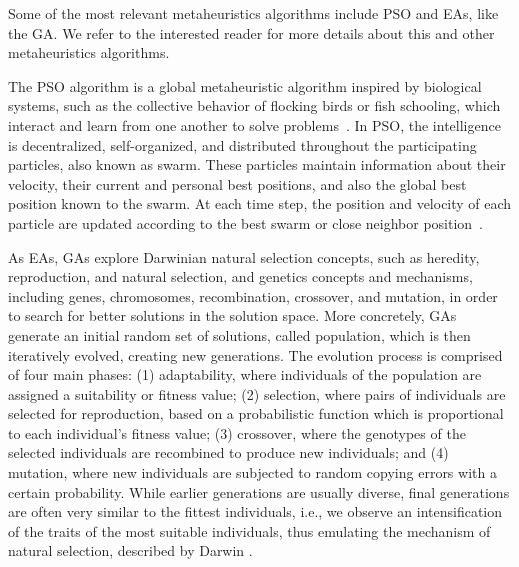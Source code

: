 	Some of the most relevant metaheuristics algorithms include \ac{PSO} and \acp{EA}, like the \ac{GA}. We refer  to the interested reader for more details about this and other metaheuristics algorithms.
	
	The \ac{PSO} algorithm is a global metaheuristic algorithm inspired by biological systems, such as the collective behavior of flocking birds or fish schooling, which interact and learn from one another to solve problems~\cite{Brownlee2011}. In \ac{PSO}, the intelligence is decentralized, self-organized, and distributed throughout the participating particles, also known as swarm. These particles maintain information about their velocity, their current and personal best positions, and also the global best position known to the swarm. At each time step, the position and velocity of each particle are updated according to the best swarm or close neighbor position~\cite{Brownlee2011}.
	
	As \acp{EA}, \acp{GA} explore Darwinian natural selection concepts, such as heredity, reproduction, and natural selection, and genetics concepts and mechanisms, including genes, chromosomes, recombination, crossover, and mutation, in order to search for better solutions in the solution space. More concretely, \acp{GA} generate an initial random set of solutions, called population, which is then iteratively evolved, creating new generations. The evolution process is comprised of four main phases: (1) adaptability, where individuals of the population are assigned a suitability or fitness value; (2) selection, where pairs of individuals are selected for reproduction, based on a probabilistic function which is proportional to each individual's fitness value; (3) crossover, where the genotypes of the selected individuals are recombined to produce new individuals; and (4) mutation, where new individuals are subjected to random copying errors with a certain probability. While earlier generations are usually diverse, final generations are often very similar to the fittest individuals, i.e., we observe an intensification of the traits of the most suitable individuals, thus emulating the mechanism of natural selection, described by Darwin \cite{Brownlee2011}. %
	
